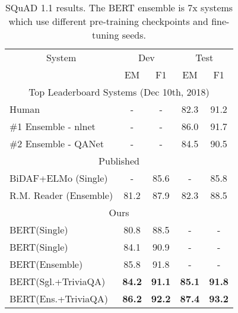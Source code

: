 \documentclass[11pt,a4paper]{article}
\newcommand\bertbase{BERT\xspace}
\newcommand\bertlarge{BERT\xspace}
\begin{document}
\begin{table}[t]
\begin{center}
{\small
\begin{tabular}{@{}lcccc@{}}
  \toprule
  \multicolumn{1}{c}{System} & \multicolumn{2}{c}{Dev} & \multicolumn{2}{c}{Test} \\
  & EM & F1 & EM & F1 \\
  \midrule

  \multicolumn{5}{c}{Top Leaderboard Systems (Dec 10th, 2018)} \\
  Human                & - & - & 82.3 & 91.2 \\ 
  \#1 Ensemble - nlnet & - & - & 86.0 & 91.7 \\ 
  \#2 Ensemble - QANet & - & - & 84.5 & 90.5 \\ 
  \midrule
  \multicolumn{5}{c}{Published}     \\
 BiDAF+ELMo (Single)    & -    & 85.6  & -     & 85.8    \\ 
 R.M. Reader (Ensemble) & 81.2 & 87.9  & 82.3  & 88.5 \\ 
  \midrule
  \multicolumn{5}{c}{Ours} \\
  \bertbase (Single)     & 80.8 & 88.5 & -   & - \\ 
  \bertlarge (Single)    & 84.1 & 90.9 & -   & - \\ 
  \bertlarge (Ensemble)  & 85.8 & 91.8 & -   & - \\ 
  \bertlarge (Sgl.+TriviaQA) & {\bf 84.2} & {\bf 91.1} & {\bf 85.1} & {\bf 91.8} \\ 
  \bertlarge (Ens.+TriviaQA) & {\bf 86.2} & {\bf 92.2} & {\bf 87.4} & {\bf 93.2}
 \\ 

\bottomrule
\end{tabular}
} \end{center}
\caption{\label{tab:squad_results} SQuAD 1.1 results. The BERT ensemble is 7x systems which use different pre-training checkpoints and fine-tuning seeds.}
\end{table}
\end{document}
